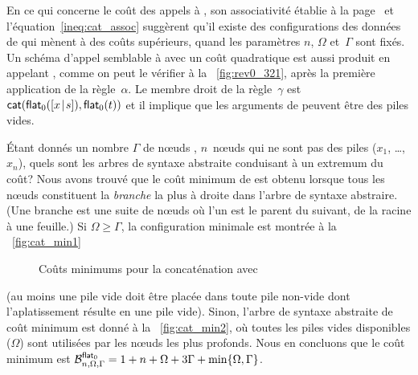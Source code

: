 En ce qui concerne le coût des appels à , son associativité
 établie à la page~\pageref{proof_assoc_cat} et
l'équation~\eqref{ineq:cat_assoc}  suggèrent
qu'il existe des configurations des données de
 qui mènent à des
coûts supérieurs, quand les paramètres \(n\), \(\Omega\) et~\(\Gamma\)
sont fixés. Un schéma d'appel semblable à
 avec un coût quadratique est aussi
produit en appelant ,
comme on peut le vérifier à la \fig~\vref{fig:rev0_321}, après la
première application de la règle~\(\alpha\). Le membre droit de la
règle~\(\gamma\) est
\(\fun{cat}(\fun{flat}_0(\cons{x}{s}),\fun{flat}_0(t))\)
 et il implique que les arguments de
 peuvent être des piles vides.

Étant donnés un nombre \(\Gamma\) de n{\oe}uds ,
\(n\)~n{\oe}uds qui ne sont pas des piles (\(x_1\), \dots, \(x_n\)),
quels sont les arbres de syntaxe abstraite conduisant à un extremum du
coût? Nous avons trouvé que le coût minimum de
 est obtenu lorsque tous les
n{\oe}uds  constituent la \emph{branche}
la plus à droite dans l'arbre de syntaxe abstraire. (Une branche est
une suite de n{\oe}uds où l'un est le parent du suivant, de la racine
à une feuille.) Si \(\Omega \geqslant \Gamma\), la configuration
minimale est montrée à la \fig~\ref{fig:cat_min1}
\begin{figure}
\centering
{}
\quad
{}
\caption{Coûts minimums pour la concaténation avec }
\label{fig:cat_min}
\end{figure}
(au moins une pile vide doit être placée dans toute pile non-vide dont
l'aplatissement résulte en une pile vide). Sinon, l'arbre de syntaxe
abstraite de coût minimum est donné à la \fig~\ref{fig:cat_min2}, où
toutes les piles vides disponibles (\(\Omega\)) sont utilisées par les
n{\oe}uds  les plus profonds. Nous en concluons que le coût
minimum
est
\(\B{\fun{flat}_0}{n,\Omega,\Gamma} = 1 + n + \Omega + 3\Gamma +
\min\{\Omega,\Gamma\}\).

